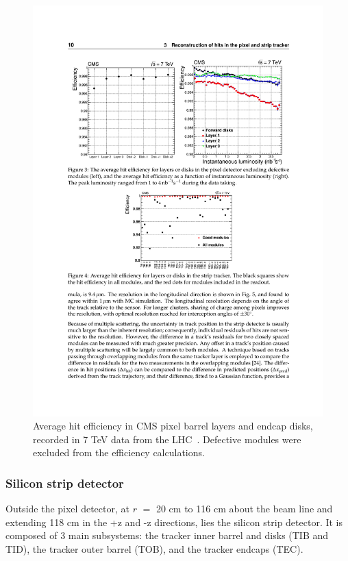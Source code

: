 \begin{figure}[hbtp]
  \begin{center}
    \includegraphics[width=2.0\cmsFigWidth]{figures/cms-pixel-performance}
    \caption{Average hit efficiency in CMS pixel barrel layers and endcap disks, recorded in 7 TeV data from the LHC~\cite{Chatrchyan:2014fea}. Defective modules were excluded from the efficiency calculations.}
    \label{fig:cms-pixel-performance}
  \end{center}
\end{figure}

\subsubsection{Silicon strip detector\label{sec:cms-strips}}

Outside the pixel detector, at $r$ $=$ 20 cm to 116 cm about the beam line and extending 118 cm in the +z and -z directions, lies the silicon strip detector. It is composed of 3 main subsystems: the tracker inner barrel and disks (TIB and TID), the tracker outer barrel (TOB), and the tracker endcaps (TEC).

